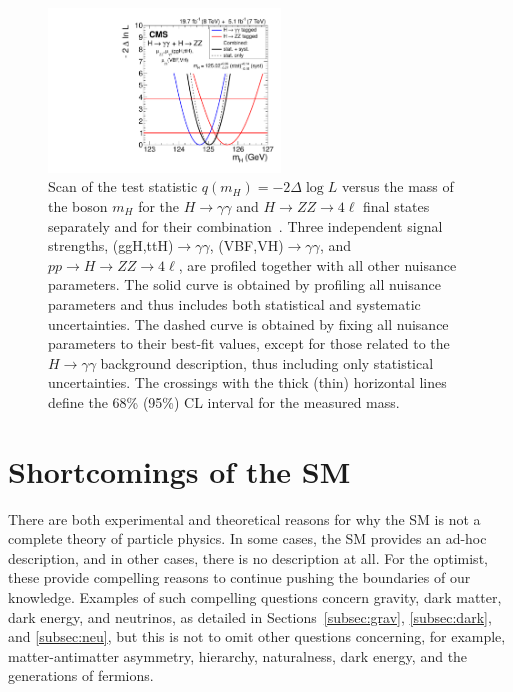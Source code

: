 \begin{figure}[ht]
 \begin{center}
    \includegraphics[width=0.55\textwidth]{figures/intro/sqr_mass_all.pdf}
      \end{center}
\caption{Scan of the test statistic $q(m_H)=−2\Delta\log{L}$ versus the mass of the boson $m_H$ for the $H\rightarrow\gamma\gamma$ and $H\rightarrow ZZ\rightarrow 4\ell$ final states separately and for their combination~\cite{Khachatryan:1979247}. Three independent signal strengths, (ggH,ttH)$\rightarrow\gamma\gamma$, (VBF,VH)$\rightarrow\gamma\gamma$, and $pp\rightarrow H\rightarrow ZZ\rightarrow 4\ell$, are profiled together with all other nuisance parameters. The solid curve is obtained by profiling all nuisance parameters and thus includes both statistical and systematic uncertainties. The dashed curve is obtained by fixing all nuisance parameters to their best-fit values, except for those related to the $H\rightarrow\gamma\gamma$ background description, thus including only statistical uncertainties. The crossings with the thick (thin) horizontal lines define the 68\% (95\%) CL interval for the measured mass. }
\label{fig:measuredmass}
\end{figure}



\section{Shortcomings of the SM\label{sec:SMshortcomings}}

There are both experimental and theoretical reasons for why the SM is not a complete theory of
particle physics. In some cases, the SM provides an ad-hoc description, and in other cases, there
is no description at all. For the optimist, these provide compelling reasons to continue
pushing the boundaries of our knowledge. Examples of such compelling questions concern gravity,
dark matter, dark energy, and neutrinos, as detailed in Sections~\ref{subsec:grav},
\ref{subsec:dark}, and \ref{subsec:neu}, but this is not to omit other questions concerning,
for example, matter-antimatter asymmetry, hierarchy, naturalness,
dark energy, and the generations of fermions.

